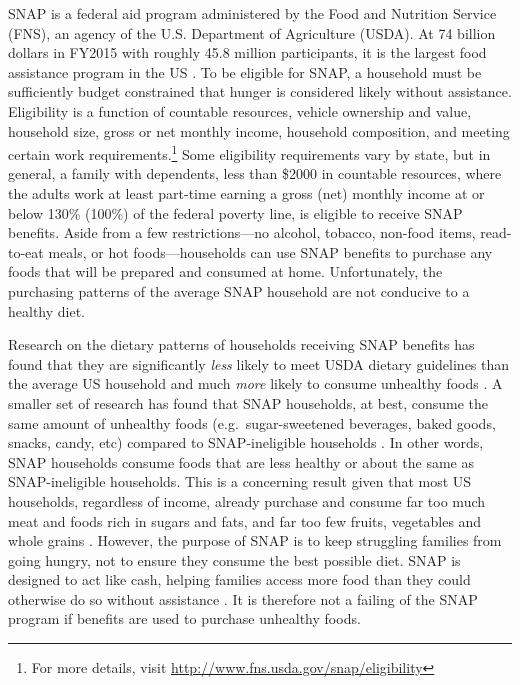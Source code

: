 \documentclass[12pt,letterpaperpaper,]{book}
\begin{document}
SNAP is a federal aid program administered by the Food and Nutrition
Service (FNS), an agency of the U.S. Department of Agriculture (USDA).
At 74 billion dollars in FY2015 with roughly 45.8 million participants,
it is the largest food assistance program in the US
\citep{usda_fns_supplemental_2016}. To be eligible for SNAP, a household
must be sufficiently budget constrained that hunger is considered likely
without assistance. Eligibility is a function of countable resources,
vehicle ownership and value, household size, gross or net monthly
income, household composition, and meeting certain work
requirements.\footnote{For more details, visit
  \url{http://www.fns.usda.gov/snap/eligibility}} Some eligibility
requirements vary by state, but in general, a family with dependents,
less than \$2000 in countable resources, where the adults work at least
part-time earning a gross (net) monthly income at or below 130\% (100\%)
of the federal poverty line, is eligible to receive SNAP benefits. Aside
from a few restrictions---no alcohol, tobacco, non-food items,
read-to-eat meals, or hot foods---households can use SNAP benefits to
purchase any foods that will be prepared and consumed at home.
Unfortunately, the purchasing patterns of the average SNAP household are
not conducive to a healthy diet.

Research on the dietary patterns of households receiving SNAP benefits
has found that they are significantly \emph{less} likely to meet USDA
dietary guidelines than the average US household and much \emph{more}
likely to consume unhealthy foods
\citep{andreyeva_dietary_2015, nguyen_supplemental_2015, wolfson_fruit_2015}.
A smaller set of research has found that SNAP households, at best,
consume the same amount of unhealthy foods (e.g.~sugar-sweetened
beverages, baked goods, snacks, candy, etc) compared to SNAP-ineligible
households \citep{todd_caloric_2014, hoynes_snap_2015}. In other words,
SNAP households consume foods that are less healthy or about the same as
SNAP-ineligible households. This is a concerning result given that most
US households, regardless of income, already purchase and consume far
too much meat and foods rich in sugars and fats, and far too few fruits,
vegetables and whole grains
\citep{usda_scientific_2015, frazao_high_1999}. However, the purpose of
SNAP is to keep struggling families from going hungry, not to ensure
they consume the best possible diet. SNAP is designed to act like cash,
helping families access more food than they could otherwise do so
without assistance \citep{hoynes_snap_2015}. It is therefore not a
failing of the SNAP program if benefits are used to purchase unhealthy
foods.
\end{document}
